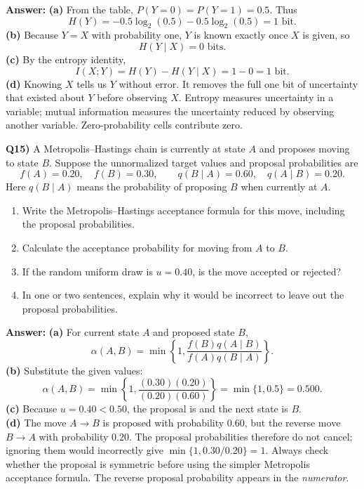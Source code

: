 \documentclass[12pt]{article}
\newenvironment{solution}{\par\smallskip\begingroup\color{blue}\noindent\textbf{Answer: }\smallskip}{\par\endgroup\medskip}
\newcommand{\question}[2]{\vspace{0.7em}\noindent\textbf{Q#1)}}
\begin{document}
\begin{solution}
\textbf{(a)} From the table, $P(Y=0)=P(Y=1)=0.5$. Thus
\[H(Y)=-0.5\log_2(0.5)-0.5\log_2(0.5)=\boxed{1\text{ bit}}.\]
\textbf{(b)} Because $Y=X$ with probability one, $Y$ is known exactly once $X$ is given, so
\[\boxed{H(Y\mid X)=0\text{ bits}}.\]
\textbf{(c)} By the entropy identity,
\[\boxed{I(X;Y)=H(Y)-H(Y\mid X)=1-0=1\text{ bit}}.\]
\textbf{(d)} Knowing $X$ tells us $Y$ without error. It removes the full one bit of uncertainty that existed about $Y$ before observing $X$.
Entropy measures uncertainty in a variable; mutual information measures the uncertainty reduced by observing another variable. Zero-probability cells contribute zero.
\end{solution}

\question{15}{}
A Metropolis--Hastings chain is currently at state $A$ and proposes moving to state $B$. Suppose the unnormalized target values and proposal probabilities are
\[
f(A)=0.20,\quad f(B)=0.30,\qquad q(B\mid A)=0.60,\quad q(A\mid B)=0.20.
\]
Here $q(B\mid A)$ means the probability of proposing $B$ when currently at $A$.
\begin{enumerate}[label=(\alph*),nosep]
\item Write the Metropolis--Hastings acceptance formula for this move, including the proposal probabilities.
\item Calculate the acceptance probability for moving from $A$ to $B$.
\item If the random uniform draw is $u=0.40$, is the move accepted or rejected?
\item In one or two sentences, explain why it would be incorrect to leave out the proposal probabilities.
\end{enumerate}

\begin{solution}
\textbf{(a)} For current state $A$ and proposed state $B$,
\[\alpha(A,B)=\min\!\left\{1,\frac{f(B)q(A\mid B)}{f(A)q(B\mid A)}\right\}.\]
\textbf{(b)} Substitute the given values:
\[\alpha(A,B)=\min\!\left\{1,\frac{(0.30)(0.20)}{(0.20)(0.60)}\right\}=\min\{1,0.5\}=\boxed{0.500}.\]
\textbf{(c)} Because $u=0.40<0.50$, the proposal is  and the next state is $B$.\\
\textbf{(d)} The move $A\to B$ is proposed with probability $0.60$, but the reverse move $B\to A$ with probability $0.20$. The proposal probabilities therefore do not cancel; ignoring them would incorrectly give $\min\{1,0.30/0.20\}=1$.
Always check whether the proposal is symmetric before using the simpler Metropolis acceptance formula. The reverse proposal probability appears in the \emph{numerator}.
\end{solution}
\end{document}
